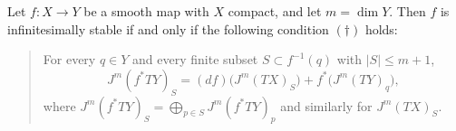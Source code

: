 %

\begin{theorem}
Let $f: X \to Y$ be a smooth map with $X$ compact, and let $m = \dim Y$.
Then $f$ is infinitesimally stable if and only if the following condition $(\dagger)$ holds:
\begin{quote}
For every $q \in Y$ and every finite subset $S \subset f^{-1}(q)$ with $|S| \leq m+1$,
\[
J^m(f^*TY)_S = (df)\bigl(J^m(TX)_S\bigr) + f^*\bigl(J^m(TY)_q\bigr),
\]
where $J^m(f^*TY)_S = \bigoplus_{p \in S} J^m(f^*TY)_p$ and similarly for $J^m(TX)_S$.
\end{quote}
\end{theorem}
